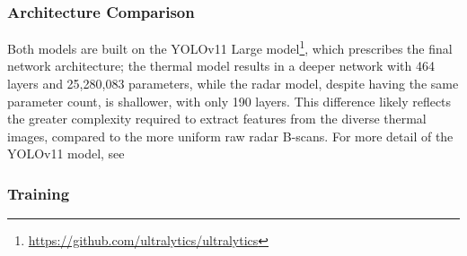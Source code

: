 \subsubsection{Architecture Comparison} \label{sec:cv_architecture_comparison}

Both models are built on the YOLOv11 Large model\footnote{\url{https://github.com/ultralytics/ultralytics}}, which prescribes the final network architecture; the thermal model results in a deeper network with 464 layers and 25,280,083 parameters, while the radar model, despite having the same parameter count, is shallower, with only 190 layers. This difference likely reflects the greater complexity required to extract features from the diverse thermal images, compared to the more uniform raw radar B-scans. For more detail of the YOLOv11 model, see \cite{khanam2024yolov11}

\subsubsection{Training} \label{sec:cv_training_comparison}


